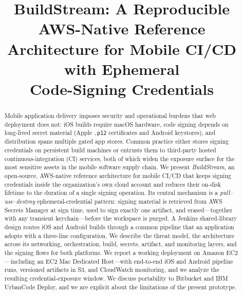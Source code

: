 \documentclass[conference]{IEEEtran}
\begin{document}
\title{BuildStream: A Reproducible AWS-Native Reference\\ Architecture for Mobile CI/CD with Ephemeral\\ Code-Signing Credentials}

\author{
}

\maketitle

\begin{abstract}
Mobile application delivery imposes security and operational burdens that web
deployment does not: iOS builds require macOS hardware, code signing depends on
long-lived secret material (Apple \texttt{.p12} certificates and Android
keystores), and distribution spans multiple gated app stores. Common practice
either stores signing credentials on persistent build machines or entrusts them
to third-party hosted continuous-integration (CI) services, both of which widen
the exposure surface for the most sensitive assets in the mobile software supply
chain. We present \emph{BuildStream}, an open-source, AWS-native reference
architecture for mobile CI/CD that keeps signing credentials inside the
organization's own cloud account and reduces their on-disk lifetime to the
duration of a single signing operation. Its central mechanism is a
\emph{pull--use--destroy} ephemeral-credential pattern: signing material is
retrieved from AWS Secrets Manager at sign time, used to sign exactly one
artifact, and erased---together with any transient keychain---before the
workspace is purged. A Jenkins shared-library design routes iOS and Android
builds through a common pipeline that an application adopts with a three-line
configuration. We describe the threat model, the architecture across its
networking, orchestration, build, secrets, artifact, and monitoring layers, and
the signing flows for both platforms. We report a working deployment on Amazon
EC2---including an EC2 Mac Dedicated Host---with end-to-end iOS and Android
pipeline runs, versioned artifacts in S3, and CloudWatch monitoring, and we
analyze the resulting credential-exposure window. We discuss portability to
Bitbucket and IBM UrbanCode Deploy, and we are explicit about the limitations
of the present prototype.
\end{abstract}
\end{document}

